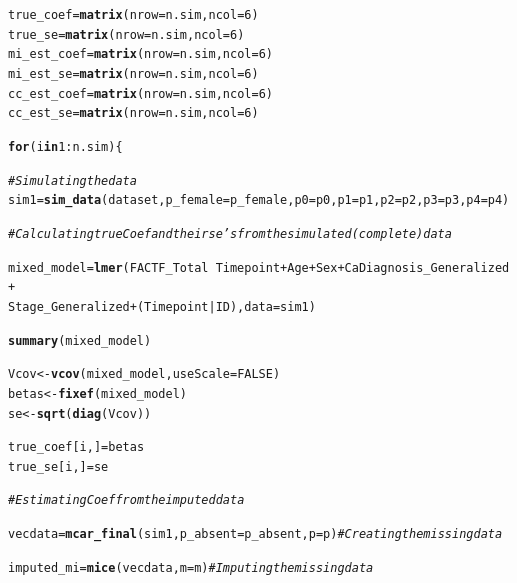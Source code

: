 \documentclass[fleqn,10pt]{wlscirep}\usepackage[]{graphicx}\usepackage[]{color}
\makeatletter
\newcommand{\hlnum}[1]{\textcolor[rgb]{0.686,0.059,0.569}{#1}}%
\newcommand{\hlcom}[1]{\textcolor[rgb]{0.678,0.584,0.686}{\textit{#1}}}%
\newcommand{\hlopt}[1]{\textcolor[rgb]{0,0,0}{#1}}%
\newcommand{\hlstd}[1]{\textcolor[rgb]{0.345,0.345,0.345}{#1}}%
\newcommand{\hlkwa}[1]{\textcolor[rgb]{0.161,0.373,0.58}{\textbf{#1}}}%
\newcommand{\hlkwb}[1]{\textcolor[rgb]{0.69,0.353,0.396}{#1}}%
\newcommand{\hlkwc}[1]{\textcolor[rgb]{0.333,0.667,0.333}{#1}}%
\newcommand{\hlkwd}[1]{\textcolor[rgb]{0.737,0.353,0.396}{\textbf{#1}}}%
\newenvironment{kframe}{%
 \def\at@end@of@kframe{}%
 \ifinner\ifhmode%
  \def\at@end@of@kframe{\end{minipage}}%
  \begin{minipage}{\columnwidth}%
 \fi\fi%
 \def\FrameCommand##1{\hskip\@totalleftmargin \hskip-\fboxsep
 \colorbox{shadecolor}{##1}\hskip-\fboxsep
     \hskip-\linewidth \hskip-\@totalleftmargin \hskip\columnwidth}%
 \MakeFramed {\advance\hsize-\width
   \@totalleftmargin\z@ \linewidth\hsize
   \@setminipage}}%
 {\par\unskip\endMakeFramed%
 \at@end@of@kframe}
\newenvironment{knitrout}{}{} %
\makeatother
\begin{document}
\begin{knitrout}
\begin{kframe}
\begin{alltt}
  \hlstd{true_coef} \hlkwb{=} \hlkwd{matrix}\hlstd{(}\hlkwc{nrow} \hlstd{= n.sim,} \hlkwc{ncol} \hlstd{=} \hlnum{6}\hlstd{)}
  \hlstd{true_se} \hlkwb{=} \hlkwd{matrix}\hlstd{(}\hlkwc{nrow} \hlstd{= n.sim,} \hlkwc{ncol} \hlstd{=} \hlnum{6}\hlstd{)}
  \hlstd{mi_est_coef} \hlkwb{=} \hlkwd{matrix}\hlstd{(}\hlkwc{nrow} \hlstd{= n.sim,} \hlkwc{ncol} \hlstd{=} \hlnum{6}\hlstd{)}
  \hlstd{mi_est_se} \hlkwb{=} \hlkwd{matrix}\hlstd{(}\hlkwc{nrow} \hlstd{= n.sim,} \hlkwc{ncol} \hlstd{=} \hlnum{6}\hlstd{)}
  \hlstd{cc_est_coef} \hlkwb{=} \hlkwd{matrix}\hlstd{(}\hlkwc{nrow} \hlstd{= n.sim,} \hlkwc{ncol} \hlstd{=} \hlnum{6}\hlstd{)}
  \hlstd{cc_est_se} \hlkwb{=} \hlkwd{matrix}\hlstd{(}\hlkwc{nrow} \hlstd{= n.sim,} \hlkwc{ncol} \hlstd{=} \hlnum{6}\hlstd{)}

  \hlkwa{for} \hlstd{(i} \hlkwa{in} \hlnum{1}\hlopt{:}\hlstd{n.sim)\{}

    \hlcom{# Simulating the data }
    \hlstd{sim1} \hlkwb{=} \hlkwd{sim_data}\hlstd{(dataset,} \hlkwc{p_female} \hlstd{= p_female,} \hlkwc{p0}\hlstd{=p0,} \hlkwc{p1}\hlstd{=p1,} \hlkwc{p2}\hlstd{=p2,} \hlkwc{p3}\hlstd{=p3,} \hlkwc{p4}\hlstd{=p4)}

    \hlcom{# Calculating true Coef and their se's from the simulated (complete) data}

    \hlstd{mixed_model} \hlkwb{=} \hlkwd{lmer}\hlstd{(FACTF_Total} \hlopt{~} \hlstd{Timepoint} \hlopt{+} \hlstd{Age} \hlopt{+} \hlstd{Sex} \hlopt{+} \hlstd{CaDiagnosis_Generalized} \hlopt{+}
                         \hlstd{Stage_Generalized} \hlopt{+} \hlstd{(Timepoint}\hlopt{|}\hlstd{ID),} \hlkwc{data} \hlstd{= sim1)}

    \hlkwd{summary}\hlstd{(mixed_model)}

    \hlstd{Vcov} \hlkwb{<-} \hlkwd{vcov}\hlstd{(mixed_model,} \hlkwc{useScale} \hlstd{=} \hlnum{FALSE}\hlstd{)}
    \hlstd{betas} \hlkwb{<-} \hlkwd{fixef}\hlstd{(mixed_model)}
    \hlstd{se} \hlkwb{<-} \hlkwd{sqrt}\hlstd{(}\hlkwd{diag}\hlstd{(Vcov))}

    \hlstd{true_coef[i, ]} \hlkwb{=} \hlstd{betas}
    \hlstd{true_se[i, ]} \hlkwb{=} \hlstd{se}

    \hlcom{# Estimating Coef from the imputed data}

    \hlstd{vecdata} \hlkwb{=} \hlkwd{mcar_final}\hlstd{(sim1,} \hlkwc{p_absent} \hlstd{= p_absent,} \hlkwc{p} \hlstd{= p)} \hlcom{# Creating the missing data}

    \hlstd{imputed_mi} \hlkwb{=} \hlkwd{mice}\hlstd{(vecdata,} \hlkwc{m} \hlstd{= m)} \hlcom{# Imputing the missing data}


\end{alltt}
\end{kframe}
\end{knitrout}
\end{document}
